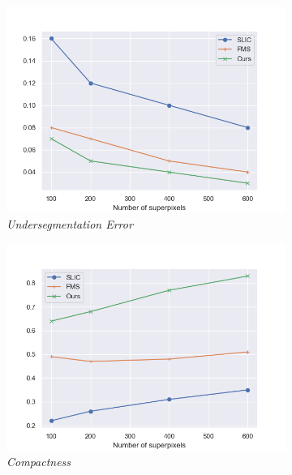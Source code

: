 \documentclass{article}
\begin{document}
        \begin{figure}[!ht]
            \centering
            \begin{subfigure}{.49\linewidth}
                \centering
                \includegraphics[width=1.1\linewidth]{pics/UE.png}
            \caption{\textit{Undersegmentation Error}}
            \end{subfigure}
            \begin{subfigure}{.49\linewidth}
                \centering
                \includegraphics[width=1.1\linewidth]{pics/CO.png}
            \caption{\textit{Compactness}}
            \end{subfigure}
            \begin{subfigure}{.49\linewidth}

\end{subfigure}
\end{figure}
\end{document}
